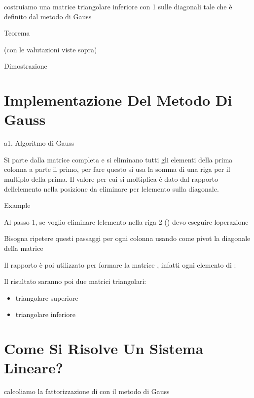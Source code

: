 \documentclass[
]{article}
\providecommand{\tightlist}{%
  \setlength{\itemsep}{0pt}\setlength{\parskip}{0pt}}
\begin{document}
costruiamo una matrice {} triangolare inferiore con 1 sulle diagonali
tale che {} è definito dal metodo di Gauss {}

{}

Teorema

{} (con le valutazioni viste sopra)

Dimostrazione

{}{}

{}{}

\hypertarget{implementazione-del-metodo-di-gauss}{%
\section{Implementazione Del Metodo Di
Gauss}\label{implementazione-del-metodo-di-gauss}}

a1. Algoritmo di Gauss

Si parte dalla matrice completa {} e si eliminano tutti gli elementi
della prima colonna a parte il primo, per fare questo si usa la somma di
una riga per il multiplo della prima. Il valore per cui si moltiplica è
dato dal rapporto dell\textquotesingle elemento nella posizione da
eliminare per l\textquotesingle elemento sulla diagonale.

Example

Al passo 1, se voglio eliminare l\textquotesingle elemento nella riga 2
({}) devo eseguire l\textquotesingle operazione {}

Bisogna ripetere questi passaggi per ogni colonna usando come pivot la
diagonale della matrice

Il rapporto è poi utilizzato per formare la matrice {}, infatti ogni
elemento di {}:\\
{}

Il risultato saranno poi due matrici triangolari:

\begin{itemize}
\tightlist
\item
  {} triangolare superiore
\item
  {} triangolare inferiore
\end{itemize}

\hypertarget{come-si-risolve-un-sistema-lineare}{%
\section{Come Si Risolve Un Sistema
Lineare?}\label{come-si-risolve-un-sistema-lineare}}

{} calcoliamo la fattorizzazione {} di {} con il metodo di Gauss
\end{document}
